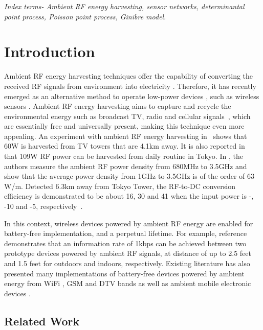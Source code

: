 \documentclass[12pt,draftclsnofoot,onecolumn]{IEEEtran}
\begin{document}
\emph{Index terms- Ambient RF energy harvesting, sensor networks, determinantal point process, Poisson point process, Ginibre model}. 


\section{Introduction}


  
 
Ambient RF energy harvesting techniques offer the capability of converting the received RF signals from environment into electricity \cite{X.2014Lu,XLuSurvey}.  Therefore, it has recently emerged as an alternative method to operate low-power devices \cite{Popovic2013,X.Lu2014}, such as wireless sensors \cite{NParks}. Ambient RF energy harvesting aims to capture and recycle the environmental energy such as broadcast TV, radio and cellular signals~\cite{X.Lu2015}, which are essentially free and universally present, making this technique even more appealing. An experiment with ambient RF energy harvesting in~\cite{A2009Sample} shows that 60W is harvested from TV towers that are 4.1km away. It is also reported in~\cite{M2008Tentzeris} that 109W RF power can be harvested from daily routine in Tokyo. In \cite{D2010Bouchouicha}, the authors measure the ambient RF power density from 680MHz to 3.5GHz and show that the average power density from 1GHz to 3.5GHz is of the order of 63 W/m. Detected 6.3km away from Tokyo Tower, the RF-to-DC conversion efficiency is demonstrated to be about 16, 30 and 41 when the input power is -, -10 and -5, respectively~\cite{R2003Shigeta}. 

In this context, wireless devices powered by ambient RF energy are enabled for battery-free implementation, and a perpetual lifetime.
For example, reference~\cite{V2013Liu} demonstrates that an information rate of 1kbps can be achieved between two prototype devices powered by ambient RF signals, at distance of up to 2.5 feet and 1.5 feet for outdoors and indoors, respectively. Existing literature has also presented many implementations of battery-free devices powered by ambient energy from WiFi \cite{U2012Olgun}, GSM \cite{M2013Pinuela} and DTV bands  \cite{P2013Nintanavongsa} as well as ambient mobile electronic devices \cite{G2011Karthik}.

\subsection{Related Work}
\label{sec:related}
\end{document}
